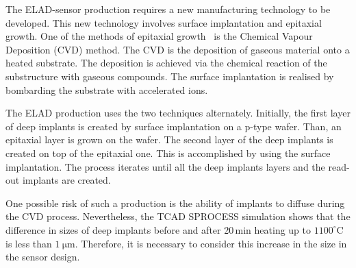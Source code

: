 
The ELAD-sensor production requires a new manufacturing technology to be developed. 
This new technology involves surface implantation and epitaxial growth. 
One of the methods of epitaxial growth~\cite{Lutz} is the Chemical Vapour Deposition (CVD) method. 
The CVD is the deposition of gaseous material onto a heated substrate. 
The deposition is achieved via the chemical reaction of the substructure with gaseous compounds. 
The surface implantation is realised by bombarding the substrate with accelerated ions.

The ELAD production uses the two techniques alternately. 
Initially, the first layer of deep implants is created by surface implantation on a p-type wafer. 
Than, an epitaxial layer is grown on the wafer. The second layer of the deep implants is created on top of the epitaxial one. 
This is accomplished by using the surface implantation. The process iterates until all the deep implants layers and the read-out implants are created. %

One possible risk of such a production is the ability of implants to diffuse during the CVD process. 
Nevertheless, the TCAD SPROCESS simulation shows that the difference in sizes of deep implants before and after 20\,min heating up to $1100^\circ$C is less than $\SI{1}{\um}$. 
Therefore, it is necessary to consider this increase in the size in the sensor design.%

